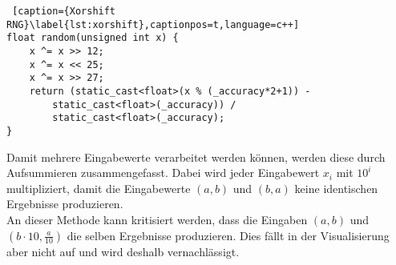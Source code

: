 \documentclass[11pt,a4paper]{article}
\begin{document}
\begin{lstlisting} [caption={Xorshift RNG}\label{lst:xorshift},captionpos=t,language=c++]
float random(unsigned int x) {
	x ^= x >> 12;
	x ^= x << 25;
	x ^= x >> 27;
	return (static_cast<float>(x % (_accuracy*2+1)) -
		static_cast<float>(_accuracy)) /
		static_cast<float>(_accuracy);
}
\end{lstlisting}
\noindent
Damit mehrere Eingabewerte verarbeitet werden können, werden diese durch Aufsummieren zusammengefasst. Dabei wird jeder Eingabewert $x_i$ mit $10^i$ multipliziert, damit die Eingabewerte $(a, b)$ und $(b, a)$ keine identischen Ergebnisse produzieren.\\
An dieser Methode kann kritisiert werden, dass die Eingaben $(a, b)$ und $(b\cdot 10, \frac{a}{10})$ die selben Ergebnisse produzieren. Dies fällt in der Visualisierung aber nicht auf und wird deshalb vernachlässigt.
\end{document}
